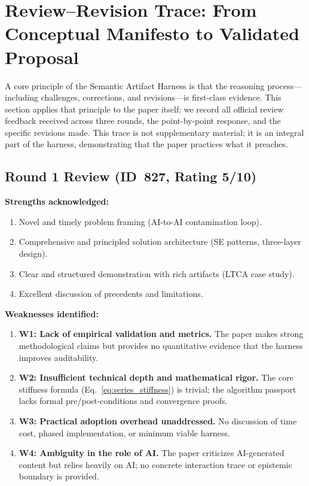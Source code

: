 \documentclass{article}
\newcommand{\revmark}{\marginpar{\footnotesize\textcolor{blue}{\textbf{Rev.\,2}}}}
\begin{document}
\section{Review--Revision Trace: From Conceptual Manifesto to Validated Proposal}\revmark
\label{sec:review_trace}

A core principle of the Semantic Artifact Harness is that the reasoning process---including challenges, corrections, and revisions---is first-class evidence. This section applies that principle to the paper itself: we record all official review feedback received across three rounds, the point-by-point response, and the specific revisions made. This trace is not supplementary material; it is an integral part of the harness, demonstrating that the paper practices what it preaches.

\subsection{Round 1 Review (ID~827, Rating 5/10)}

\textbf{Strengths acknowledged:}
\begin{enumerate}[nosep]
    \item Novel and timely problem framing (AI-to-AI contamination loop).
    \item Comprehensive and principled solution architecture (SE patterns, three-layer design).
    \item Clear and structured demonstration with rich artifacts (LTCA case study).
    \item Excellent discussion of precedents and limitations.
\end{enumerate}

\textbf{Weaknesses identified:}
\begin{enumerate}[nosep]
    \item \textbf{W1: Lack of empirical validation and metrics.} The paper makes strong methodological claims but provides no quantitative evidence that the harness improves auditability.
    \item \textbf{W2: Insufficient technical depth and mathematical rigor.} The core stiffness formula (Eq.~\ref{eq:series_stiffness}) is trivial; the algorithm passport lacks formal pre/post-conditions and convergence proofs.
    \item \textbf{W3: Practical adoption overhead unaddressed.} No discussion of time cost, phased implementation, or minimum viable harness.
    \item \textbf{W4: Ambiguity in the role of AI.} The paper criticizes AI-generated content but relies heavily on AI; no concrete interaction trace or epistemic boundary is provided.
\end{enumerate}
\end{document}
